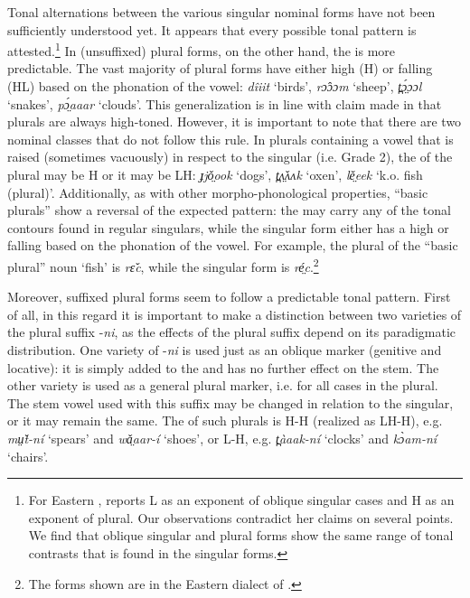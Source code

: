 \documentclass[output=paper,newtxmath,modfonts,nonflat,draftmode]{langsci/langscibook}
\begin{document}
Tonal alternations between the various singular nominal forms have not been sufficiently understood yet. It appears that every possible tonal pattern is attested.\footnote{For\label{fn:monich:15} Eastern , \citet{gjersøe2017} reports L  as an exponent of oblique singular cases and H  as an exponent of  plural. Our observations contradict her claims on several points. We find that oblique singular and  plural forms show the same range of tonal contrasts that is found in the  singular forms.}  In (unsuffixed) plural forms, on the other hand, the  is more predictable. The vast majority of plural forms have either high (H) or falling (HL)  based on the phonation of the vowel: \textit{dîiit} ‘birds’, \textit{rɔ̂ɔɔm} ‘sheep’, \textit{t̪ɔ̤́ɔɔl} ‘snakes’, \textit{pɔ̤́aaar} ‘clouds’. This generalization is in line with claim made in \citet{gjersøe2017} that plurals are always high-toned. However, it is important to note that there are two nominal classes that do not follow this rule. In plurals containing a vowel that is raised (sometimes vacuously) in respect to the singular (i.e. Grade 2), the  of the plural may be H or it may be LH: \textit{ɟjǒ̤ook} ‘dogs’, \textit{t̪ʌ̤̌ʌʌk} ‘oxen’, \textit{lě̤eek} ‘k.o. fish (plural)’. Additionally, as with other morpho-phonological properties, “basic plurals” show a reversal of the expected pattern: the  may carry any of the tonal contours found in regular singulars, while the singular form either has a high or falling  based on the phonation of the vowel. For example, the plural of the “basic plural” noun ‘fish’ is \textit{rɛ̌c}, while the singular form is \textit{ré̤c}.\footnote{The\label{fn:monich:16} forms shown are in the Eastern dialect of .}

Moreover, suffixed plural forms seem to follow a predictable tonal pattern. First of all, in this regard it is important to make a distinction between two varieties of the plural suffix -\textit{ni}, as the effects of the plural suffix depend on its paradigmatic distribution. One variety of -\textit{ni} is used just as an oblique marker (genitive and locative): it is simply added to the   and has no further effect on the stem. The other variety is used as a general plural marker, i.e. for all cases in the plural. The stem vowel used with this suffix may be changed in relation to the  singular, or it may remain the same. The  of such plurals is H-H (realized as LH-H), e.g. \textit{mṳ̌t-ní} ‘spears’ and \textit{wǎ̤aar-í} ‘shoes’, or L-H, e.g. \textit{t̪àaak-ní} ‘clocks’ and \textit{kɔ̀am-ní} ‘chairs’.
\end{document}

